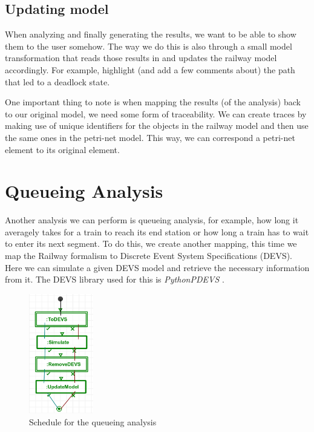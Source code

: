 \documentclass{article}
\begin{document}
\subsection{Updating model}
\label{safety_updating}

When analyzing and finally generating the results, we want to be able to show them to the user somehow. The way we do this is also through a small model transformation that reads those results in and updates the railway model accordingly. For example, highlight (and add a few comments about) the path that led to a deadlock state.

One important thing to note is when mapping the results (of the analysis) back to our original model, we need some form of traceability. We can create traces by making use of unique identifiers for the objects in the railway model and then use the same ones in the petri-net model. This way, we can correspond a petri-net element to its original element.


\section{Queueing Analysis}

Another analysis we can perform is queueing analysis, for example, how long it averagely takes for a train to reach its end station or how long a train has to wait to enter its next segment. To do this, we create another mapping, this time we map the Railway formalism to Discrete Event System Specifications (DEVS). Here we can simulate a given DEVS model and retrieve the necessary information from it. The DEVS library used for this is \textit{PythonPDEVS} \cite{pythonpdevs}.

\begin{figure}[H]
    \centering
    \includegraphics[width=0.25\textwidth]{images/queueing_analysis_schedule.png}
    \caption{Schedule for the queueing analysis}
    \label{schedule_queueing}
\end{figure}
\end{document}
